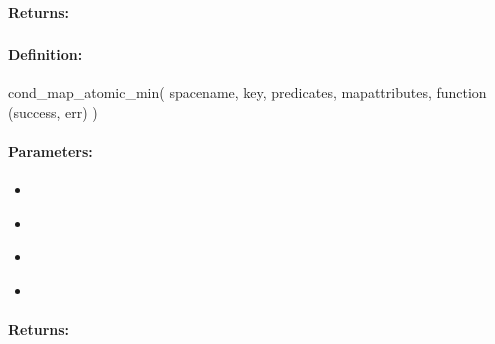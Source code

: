 \paragraph{Returns:}


\pagebreak
\subsubsection{}
\label{api:nodejs:cond_map_atomic_min}


\paragraph{Definition:}
\begin{javascriptcode}
cond_map_atomic_min(
        spacename, key, predicates, mapattributes, function (success, err) {})
\end{javascriptcode}
\paragraph{Parameters:}
\begin{itemize}[noitemsep]
\item {}\\

\item {}\\

\item {}\\

\item {}\\

\end{itemize}

\paragraph{Returns:}


\pagebreak
\subsubsection{}
\label{api:nodejs:map_atomic_max}


